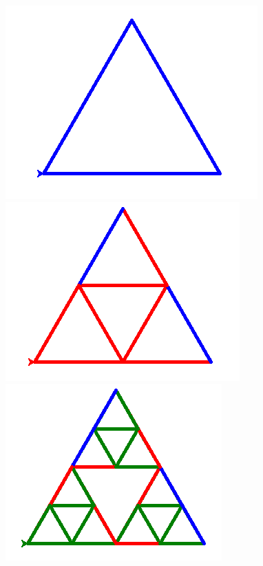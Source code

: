 \documentclass[11pt,class=report,crop=false]{standalone}
\begin{document}

\begin{activite}



\begin{center}
\includegraphics[scale=\myscale,scale=0.3]{screen-turtle-4a}
\includegraphics[scale=\myscale,scale=0.3]{screen-turtle-4b}
\includegraphics[scale=\myscale,scale=0.3]{screen-turtle-4c}

\end{center}
\end{activite}
\end{document}
